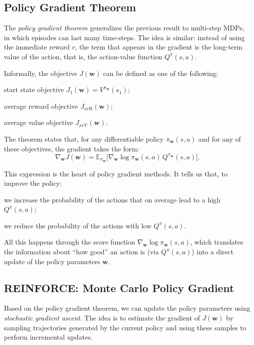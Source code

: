 \subsection{Policy Gradient Theorem}

The \emph{policy gradient theorem} generalizes the previous result to multi-step MDPs, in which episodes can last many time-steps. The idea is similar: instead of using the immediate reward $r$, the term that appears in the gradient is the long-term value of the action, that is, the action-value function $Q^{\pi}(s,a)$.

Informally, the objective $J(\mathbf{w})$ can be defined as one of the following:
\begin{compactitemize}
    \item start state objective $J_1(\mathbf{w}) = V^{\pi_{\mathbf{w}}}(s_1)$;
    \item average reward objective $J_{\text{avR}}(\mathbf{w})$;
    \item average value objective $J_{\text{avV}}(\mathbf{w})$.
\end{compactitemize}
The theorem states that, for any differentiable policy $\pi_{\mathbf{w}}(s,a)$ and for any of these objectives, the gradient takes the form:
\[
\nabla_{\mathbf{w}} J(\mathbf{w})
= \mathbb{E}_{\pi_{\mathbf{w}}}\big[\nabla_{\mathbf{w}} \log \pi_{\mathbf{w}}(s,a)\, Q^{\pi_{\mathbf{w}}}(s,a)\big].
\]

This expression is the heart of policy gradient methods. It tells us that, to improve the policy:
\begin{compactitemize}
    \item we increase the probability of the actions that on average lead to a high $Q^{\pi}(s,a)$;
    \item we reduce the probability of the actions with low $Q^{\pi}(s,a)$.
\end{compactitemize}
All this happens through the score function $\nabla_{\mathbf{w}} \log \pi_{\mathbf{w}}(s,a)$, which translates the information about “how good” an action is (via $Q^{\pi}(s,a)$) into a direct update of the policy parameters $\mathbf{w}$.

\subsection{REINFORCE: Monte Carlo Policy Gradient}

Based on the policy gradient theorem, we can update the policy parameters using \emph{stochastic gradient ascent}. The idea is to estimate the gradient of $J(\mathbf{w})$ by sampling trajectories generated by the current policy and using these samples to perform incremental updates.

